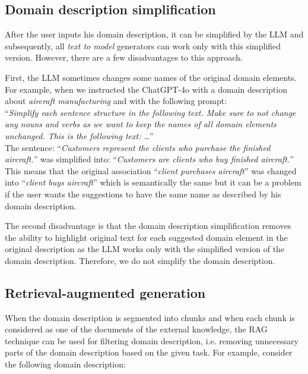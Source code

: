 \subsection{Domain description simplification}

After the user inputs his domain description, it can be simplified by the LLM and subsequently, all \emph{text to model} generators can work only with this simplified version. However, there are a few disadvantages to this approach.

First, the LLM sometimes changes some names of the original domain elements. For example, when we instructed the ChatGPT-4o with a domain description about \emph{aircraft manufacturing} and with the following prompt: \\

\noindent{}``\textit{Simplify each sentence structure in the following text. Make sure to not change any nouns and verbs as we want to keep the names of all domain elements unchanged. This is the following text: \ldots}'' \\

\noindent{}The sentence: ``\textit{Customers represent the clients who purchase the finished aircraft.}'' was simplified into: ``\textit{Customers are clients who buy finished aircraft.}'' This means that the original association ``\textit{client purchases aircraft}'' was changed into ``\textit{client buys aircraft}'' which is semantically the same but it can be a problem if the user wants the suggestions to have the same name as described by his domain description.

The second disadvantage is that the domain description simplification removes the ability to highlight original text for each suggested domain element in the original description as the LLM works only with the simplified version of the domain description. Therefore, we do not simplify the domain description.


\subsection{Retrieval-augmented generation}

When the domain description is segmented into chunks and when each chunk is considered as one of the documents of the external knowledge, the RAG technique can be used for filtering domain description, i.e. removing unnecessary parts of the domain description based on the given task. For example, consider the following domain description: \\

